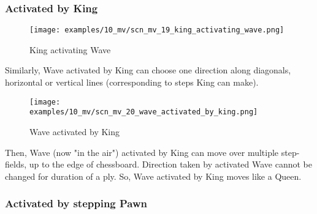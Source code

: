 \clearpage %

\subsubsection*{Activated by King}
\label{sec:Miranda's veil/Wave/Movement/Activated by King}

\vspace*{-1.4\baselineskip}
\noindent
\begin{figure}[h]
\texttt{[image: examples/10\_mv/scn\_mv\_19\_king\_activating\_wave.png]}
\caption{King activating Wave}
\label{fig:scn_mv_19_king_activating_wave}
\end{figure}

Similarly, Wave activated by King can choose one direction along diagonals, horizontal
or vertical lines (corresponding to steps King can make).

\clearpage %

\vspace*{-2.1\baselineskip}
\noindent
\begin{figure}[!h]
\texttt{[image: examples/10\_mv/scn\_mv\_20\_wave\_activated\_by\_king.png]}
\caption{Wave activated by King}
\label{fig:scn_mv_20_wave_activated_by_king}
\end{figure}

Then, Wave (now "in the air") activated by King can move over multiple step-fields,
up to the edge of chessboard. Direction taken by activated Wave cannot be changed
for duration of a ply. So, Wave activated by King moves like a Queen.

\clearpage %

\subsubsection*{Activated by stepping Pawn}
\label{sec:Miranda's veil/Wave/Movement/Activated by stepping Pawn}

